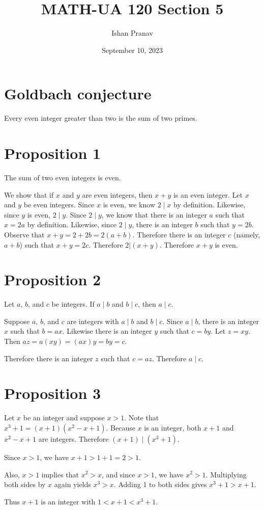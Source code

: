 \documentclass[12pt]{article}
\title{MATH-UA 120 Section 5}
\author{Ishan Pranav}
\date{September 10, 2023}
\begin{document}
\maketitle
\section*{Goldbach conjecture}
Every even integer greater than two is the sum of two primes.
\section*{Proposition 1}
The sum of two even integers is even.

We show that if $x$ and $y$ are even integers, then $x+y$ is an even integer. Let $x$ and $y$ be even integers. Since $x$ is even, we know $2 \mid x$ by definition. Likewise, since $y$ is even, $2 \mid y$. Since $2 \mid y$, we know that there is an integer $a$ such that $x=2a$ by definition. Likewise, since $2 \mid y$, there is an integer $b$ such that $y=2b$. Observe that $x+y=2+2b=2(a+b)$. Therefore there is an integer $c$ (namely, $a+b$) such that $x+y=2c$. Therefore $2|(x+y)$. Therefore $x+y$ is even.
\section*{Proposition 2}
Let $a$, $b$, and $c$ be integers. If $a \mid b$ and $b \mid c$, then $a \mid c$.

Suppose $a$, $b$, and $c$ are integers with $a \mid b$ and $b \mid c$. Since $a \mid b$, there is an integer $x$ such that $b=ax$. Likewise there is an integer $y$ such that $c=by$. Let $z=xy$. Then $az=a(xy)=(ax)y=by=c$.

Therefore there is an integer $z$ such that $c=az$. Therefore $a \mid c$.
\section*{Proposition 3}
Let $x$ be an integer and suppose $x>1$. Note that $x^3+1=(x+1)(x^2-x+1)$. Because $x$ is an integer, both $x+1$ and $x^2-x+1$ are integers. Therefore $(x+1) \mid (x^3+1)$.

Since $x>1$, we have $x+1>1+1=2>1$.

Also, $x>1$ implies that $x^2>x$, and since $x>1$, we have $x^2>1$. Multiplying both sides by $x$ again yields $x^3>x$. Adding 1 to both sides gives $x^3+1>x+1$.

Thus $x+1$ is an integer with $1<x+1<x^3+1$.
\end{document}
